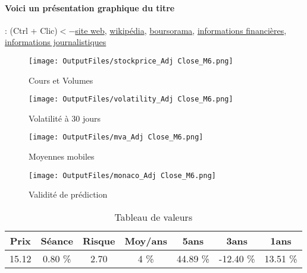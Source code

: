 \documentclass[11pt,a4paper]{report}%
\begin{document}
\paragraph{Voici un présentation graphique du titre} : (Ctrl + Clic)$<-$\href{https://www.groupem6.fr/finance/presentations-financieres/presentations-investisseurs/}{site web}, \href{https://fr.wikipedia.org/wiki/M6}{wikipédia}, \href{https://www.boursorama.com/cours/1rPMMT}{boursorama}, \href{https://www.qwant.com/?q=site:https:%2f%2fwww.easybourse.com%2faction-societe%2fM6&t=web&client=ext-firefox-hp}{informations financières}, \href{https://bourse.lerevenu.com/cours-de-bourse/fiche-valeur-synthese/M6/MMT-FR}{informations journalistiques}
\begin{figure}[!htb]
   \begin{minipage}{0.5\textwidth}
     \centering
     \texttt{[image: OutputFiles/stockprice\_Adj Close\_M6.png]}
     \caption{Cours et Volumes}\label{Fig:price_M6}
   \end{minipage}\hfill
   \begin{minipage}{0.5\textwidth}
     \centering
     \texttt{[image: OutputFiles/volatility\_Adj Close\_M6.png]}
     \caption{Volatilité à 30 jours}\label{Fig:volat_M6}
   \end{minipage}
\end{figure}
\begin{figure}[!htb]
   \begin{minipage}{0.5\textwidth}
     \centering
     \texttt{[image: OutputFiles/mva\_Adj Close\_M6.png]}
     \caption{Moyennes mobiles}\label{Fig:mva_M6}
   \end{minipage}\hfill
   \begin{minipage}{0.5\textwidth}
     \centering
     \texttt{[image: OutputFiles/monaco\_Adj Close\_M6.png]}
     \caption{Validité de prédiction}\label{Fig:prediction_M6}
   \end{minipage}
\end{figure}

\begin{table}[H]
  \centering
    \begin{tabular}{|c|c|c|c|c|c|c|}
    \hline
    Prix & Séance & Risque  & Moy/ans & 5ans & 3ans & 1ans \\
    \hline
    15.12 &    0.80 \%    & 2.70 & 4 \% & 44.89 \% & -12.40 \% & 13.51 \% \\
    \hline
    \end{tabular}%
        \label{tab:table_M6}%
      \caption{Tableau de valeurs}
\end{table}%
\end{document}
